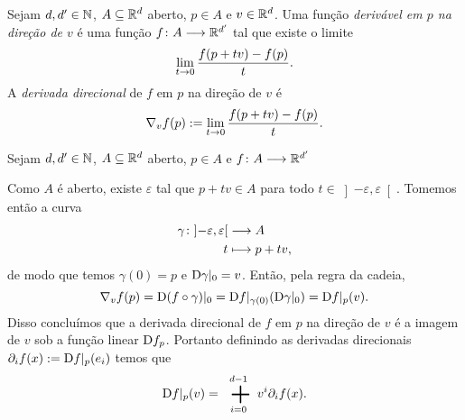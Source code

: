 \begin{definition}
Sejam $d,d' \in \mathbb{N}$, $A \subseteq \mathbb{R}^d$ aberto, $p \in A$ e $v \in \mathbb{R}^d$. %
Uma função \emph{derivável em $p$ na direção de $v$} é uma função ${f}\colon {A} \longrightarrow {\mathbb{R}^{d'}}$ tal que existe o limite
	\begin{equation*}
	\lim_{t \rightarrow 0} \frac{f(p+tv)-f(p)}{t}.
	\end{equation*}
A \emph{derivada direcional} de $f$ em $p$ na direção de $v$ é
	\begin{equation*}
	\nabla_v f(p) := \lim_{t \rightarrow 0} \frac{f(p+tv)-f(p)}{t}.
	\end{equation*}
\end{definition}

\begin{proposition}
Sejam $d,d' \in \mathbb{N}$, $A \subseteq \mathbb{R}^d$ aberto, $p \in A$ e ${f}\colon {A} \longrightarrow {\mathbb{R}^{d'}}$
\end{proposition}


Como $A$ é aberto, existe $\varepsilon$ tal que $p+tv \in A$ para todo $t \in \left]-\varepsilon,\varepsilon \right[$. Tomemos então a curva
	\begin{align*}
	{\gamma}\colon {\left]-\varepsilon,\varepsilon \right[} &\longrightarrow {A} \\{t} &\longmapsto p+tv,
	\end{align*}
de modo que temos $\gamma(0)=p$ e $\mathrm{D} \gamma|_0 = v$. Então, pela regra da cadeia,
	\begin{equation*}
	\nabla_v f(p) = \mathrm{D} (f \circ \gamma)|_0 = \mathrm{D} f|_{\gamma(0)} (\mathrm{D} \gamma|_0) = \mathrm{D} f|_p(v).
	\end{equation*}
Disso concluímos que a derivada direcional de $f$ em $p$ na direção de $v$ é a imagem de $v$ sob a função linear $\mathrm{D} f_p$. Portanto definindo as derivadas direcionais $\partial_i f(x) := \mathrm{D} f|_p(e_i)$ temos que
	\begin{equation*}
	\D f|_p(v) = \sum_{i=0}^{d-1} v^i \partial_i f(x).
	\end{equation*}





